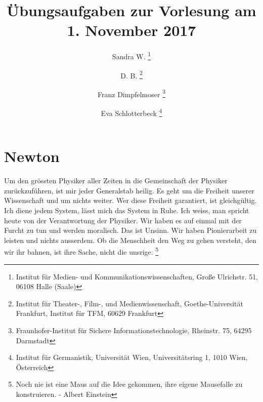 \documentclass[a4 paper]{article}
\begin{document}
\title{Übungsaufgaben zur Vorlesung am 1. November 2017}
\author{Sandra W.
            \thanks{
            Institut für Medien- und Kommunikationswissenschaften, 
            Große Ulrichstr. 51, 06108 Halle (Saale)}
        \and D. B. 
            \thanks{ 
            Institut für Theater-, Film-, und Medienwissenschaft,
            Goethe-Universität Frankfurt, 
            Institut für TFM, 60629 Frankfurt}
        \and Franz Dimpfelmoser 
            \thanks{
            Fraunhofer-Institut für Sichere Informationstechnologie,
            Rheinstr. 75, 64295 Darmstadt}
        \and Eva Schlotterbeck 
            \thanks{
            Institut für Germanistik,
            Universität Wien,
            Universitätsring 1, 1010 Wien, Österreich}
        } 
        
\maketitle
    
\newpage

\setcounter{secnumdepth}{5}
\setcounter{tocdepth}{5}    
\tableofcontents 

\newpage

\part{Newton} \label{Newton} 

    Um den grössten Physiker aller Zeiten in die Gemeinschaft der Physiker
    zurückzuführen, ist mir jeder Generalstab heilig. Es geht um die Freiheit unserer Wissenschaft und um nichts weiter. Wer diese Freiheit garantiert, ist gleichgültig. Ich diene jedem System, lässt mich das System in Ruhe. Ich weiss, man spricht heute von der Verantwortung der Physiker. Wir haben es auf einmal mit der Furcht zu tun und werden moralisch. Das ist Unsinn. Wir haben Pionierarbeit zu leisten und nichts ausserdem. Ob die Menschheit den Weg zu gehen versteht, den wir ihr bahnen, ist ihre Sache, nicht die unsrige. 
        \footnote{Noch nie ist eine Maus auf die Idee gekommen, ihre eigene Mausefalle zu konstruieren. - Albert Einstein}
\end{document}
